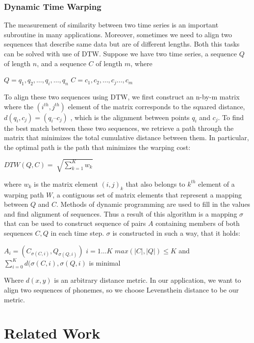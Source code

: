 \subsubsection*{Dynamic Time Warping}\cite{ratanamahatana2004everything}
The measurement of similarity between two time series is
an important subroutine in many applications.
Moreover, sometimes we need to align two sequences that describe same data but are of different lengths.
Both this tasks can be solved with use of DTW.
Suppose we have two time series, a sequence $Q$ of length $n$,
and a sequence $C$ of length $m$, where
\begin{center}
$Q = q_1 ,q_2 ,\dots, q_i ,\dots ,q_n$
\linebreak
$C = c_1 ,c_2 ,\dots, c_j \dots, c_m$
\end{center}
To align these two sequences using DTW, we first
construct an n-by-m matrix where the $(i^{th} , j^{th} )$ element of
the matrix corresponds to the squared distance, $d(q_i , c_j) =
(q_i – c_j )$ , which is the alignment between points $q_i$ and $c_j$.
To find the best match between these two sequences, we
retrieve a path through the matrix that minimizes the total
cumulative distance between them.
In particular, the optimal path is the path that minimizes the
warping cost:
\begin{center}
$DTW ( Q , C ) = \sqrt[]{\sum_{k=1}^{K}w_k}$
\end{center}
where $w_k$ is the matrix element $(i,j)_k$ that also belongs to $k^{th}$
element of a warping path $W$, a contiguous set of matrix
elements that represent a mapping between $Q$ and $C$.
Methods of dynamic programming are used to fill in the values and find alignment of sequences.
Thus a result of this algorithm is a mapping $\sigma$ that can be used to construct sequence of pairs $A$ containing members of both sequences $C,Q$ in each time step.
$\sigma$ is constructed in such a way, that it holds:
\begin{center}
$A_i = (C_{\sigma (C,i)}, Q_{\sigma (Q, i)})$ \linebreak
$i = 1 \dots K$ \linebreak
$max(|C|,|Q|) \le K$ \linebreak
and $\sum_{i=0}^K d(\sigma (C,i), \sigma(Q,i)$ is minimal
\end{center}
Where $d(x,y)$ is an arbitrary distance metric.
In our application, we want to align two sequences of phonemes, so we choose Levensthein distance to be our metric.
\section{Related Work}
